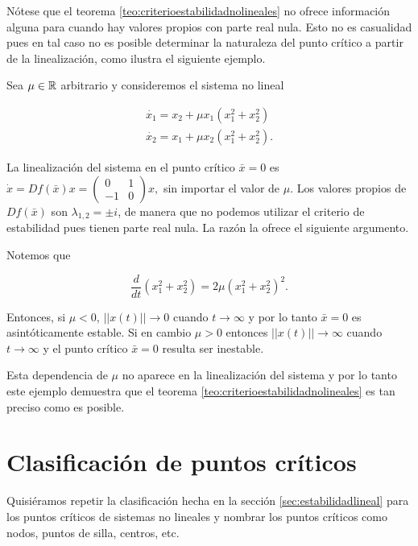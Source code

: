 \begin{example}
\end{example}

Nótese que el teorema \ref{teo:criterioestabilidadnolineales} no ofrece información alguna para cuando hay valores propios con parte real nula. Esto no es casualidad pues en tal caso no es posible determinar la naturaleza del punto crítico a partir de la linealización, como ilustra el siguiente ejemplo.

\begin{example} \label{ex:nolinealnohiperbolico}
Sea $\mu \in {\ensuremath{\mathbb{R}}}$ arbitrario y consideremos el sistema no lineal

$$
	\begin{array}{l}
		\dot{x_1} = x_2 + \mu x_1(x_1^2 + x_2^2) \\
		\dot{x_2} = x_1 + \mu x_2(x_1^2 + x_2^2).
	\end{array}
$$

La linealización del sistema en el punto crítico $\bar{x} = 0$ es $\dot{x} = Df(\bar{x})x = \left( \begin{array}{ll} 0 & 1 \\ -1 & 0 \end{array} \right) x,$ sin importar el valor de $\mu$.
Los valores propios de $Df(\bar{x})$ son $\lambda_{1,2} = \pm i$, de manera que no podemos utilizar el criterio de estabilidad pues tienen parte real nula. La razón la ofrece el siguiente argumento.

Notemos que

$$ \dfrac{d}{dt} (x_1^2 + x_2^2) = 2\mu(x_1^2 + x_2^2)^2. $$

Entonces, si $\mu < 0$, $||x(t)|| \to 0$ cuando $t \to \infty$ y por lo tanto $\bar{x} = 0$ es asintóticamente estable.
Si en cambio $\mu > 0$ entonces $||x(t)|| \to \infty$ cuando $t \to \infty$ y el punto crítico $\bar{x} = 0$ resulta ser inestable.

Esta dependencia de $\mu$ no aparece en la linealización del sistema y por lo tanto este ejemplo demuestra que el teorema \ref{teo:criterioestabilidadnolineales} es tan preciso como es posible.
\end{example}


\section{Clasificación de puntos críticos}

Quisiéramos repetir la clasificación hecha en la sección \ref{sec:estabilidadlineal} para los puntos críticos de sistemas no lineales y nombrar los puntos críticos como nodos, puntos de silla, centros, etc.

